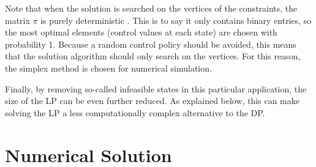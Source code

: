 \documentclass[conference]{IEEEtran}
\begin{document}
Note that when the solution is searched on the vertices of the constraints, the matrix $\pi$ is purely deterministic \cite{MDPs}. This is to say it only contains binary entries, so the most optimal elements (control values at each state) are chosen with probability 1. Because a random control policy should be avoided, this means that the solution algorithm should only search on the vertices. For this reason, the simplex method is chosen for numerical simulation.

Finally, by removing so-called infeasible states in this particular application, the size of the LP can be even further reduced. As explained below, this can make solving the LP a less computationally complex alternative to the DP.

\section{Numerical Solution}


\end{document}
